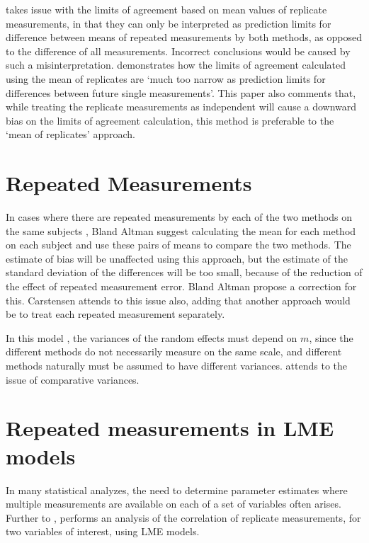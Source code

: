 \documentclass[MAIN.tex]{subfiles}
\begin{document}
\citet{BXC2008} takes issue with the limits of agreement based on
mean values of replicate measurements, in that they can only be interpreted as prediction
limits for difference between means of repeated measurements by
both methods, as opposed to the difference of all measurements.
Incorrect conclusions would be caused by such a misinterpretation.
\citet{BXC2008} demonstrates how the limits of agreement
calculated using the mean of replicates are `much too narrow as
prediction limits for differences between future single
measurements'. This paper also comments that, while treating the
replicate measurements as independent will cause a downward bias
on the limits of agreement calculation, this method is preferable
to the `mean of replicates' approach.


	\section{Repeated Measurements}
	
	In cases where there are repeated measurements by each of the two
	methods on the same subjects , Bland Altman suggest calculating
	the mean for each method on each subject and use these pairs of
	means to compare the two methods.
	The estimate of bias will be unaffected using this approach, but
	the estimate of the standard deviation of the differences will be
	too small, because of the reduction of the effect of repeated
	measurement error. Bland Altman propose a correction for this.
	Carstensen attends to this issue also, adding that another
	approach would be to treat each repeated measurement separately.
	
	
	
	In this model , the variances of the random effects must depend on
	$m$, since the different methods do not necessarily measure on the
	same scale, and different methods naturally must be assumed to
	have different variances. \citet{BXC2004} attends to the issue of
	comparative variances.
\section{Repeated measurements in LME models}

In many statistical analyzes, the need to determine parameter estimates where multiple measurements are available on each of a set of variables often arises. Further to \citet{lam}, \citet{hamlett} performs an analysis of the correlation of replicate measurements, for two variables of interest, using LME models.
\end{document}
